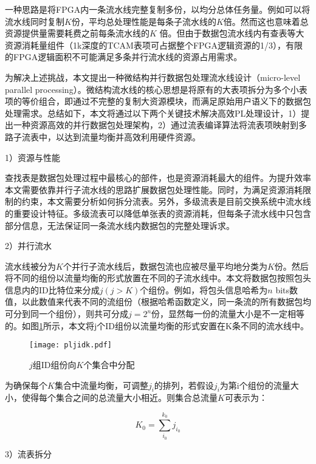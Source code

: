一种思路是将FPGA内一条流水线完整复制多份，以均分总体任务量。例如可以将流水线同时复制$K$份，平均总处理性能是每条子流水线的$K$倍。然而这也意味着总资源提供量需要耗费之前每条流水线的$K$ 倍。但由于数据包流水线内有查表等大资源消耗量组件（1k深度的TCAM表项可占据整个FPGA逻辑资源的1/3），有限的FPGA逻辑面积不可能满足多条并行流水线的资源占用需求。

为解决上述挑战，本文提出一种微结构并行数据包处理流水线设计（micro-level parallel processing）。微结构流水线的核心思想是将原有的大表项拆分为多个小表项的等价组合，即通过不完整的复制大资源模块，而满足原始用户语义下的数据包处理需求。总结如下，本文将通过以下两个关键技术解决高效PL处理设计，1）提出一种资源高效的并行数据包处理架构，2）通过流表编译算法将流表项映射到多路子流表中，以达到流量均衡并高效利用硬件资源。

1）资源与性能

查找表是数据包处理过程中最核心的部件，也是资源消耗最大的组件。为提升效率本文需要依靠并行子流水线的思路扩展数据包处理性能。同时，为满足资源消耗限制的约束，本文需要分析如何拆分流表。另外，多级流表是目前交换系统中流水线的重要设计特征。多级流表可以降低单张表的资源消耗，但每条子流水线中只包含部分信息，无法保证同一条流水线内数据包的完整处理诉求。 




2）并行流水

流水线被分为$K$个并行子流水线后，数据包流也应被尽量平均地分类为$K$份。然后将不同的组份以流量均衡的形式放置在不同的子流水线中。本文将数据包按照包头信息内的ID比特位来分成$j (j > K)$个组份。例如，将包头信息哈希为$n$ bits数值，以此数值来代表不同的流组份（根据哈希函数定义，同一条流的所有数据包均可分到同一个组份），则共可分成$j=2^{n}$份，显然每一份的流量大小是不一定相等的。如图\ref{fig:pljidk}所示，本文将j个ID组份以流量均衡的形式安置在K条不同的流水线中。

\begin{figure}[!ht]
	\centering 
	\vspace{-1.5mm} 
	\texttt{[image: pljidk.pdf]}
	\caption{$ j $组ID组份向$ K $个集合中分配} \label{fig:pljidk}
\end{figure}

为确保每个$K$集合中流量均衡，可调整$j_i$的排列，若假设$ j_i $为第i个组份的流量大小，使得每个集合之间的总流量大小相近。则集合总流量$ K $可表示为：

\begin{equation} \label{pl1}
K_0=\sum_{i_0}^{k_0}j_{i_0}
\end{equation}

3）流表拆分


